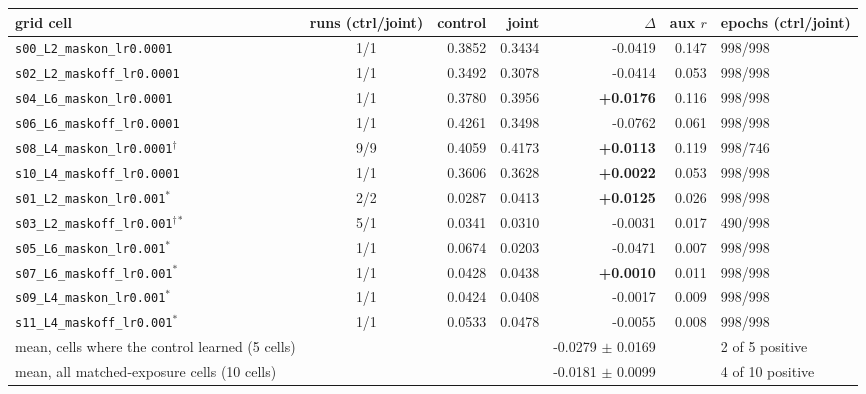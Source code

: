 \begin{table}[htbp]
\centering\small
\footnotesize
\begin{tabular}{lcrrrrl}
\toprule
grid cell & runs (ctrl/joint) & control & joint & $\Delta$ & aux $r$ & epochs (ctrl/joint) \\
\midrule
\texttt{s00\_L2\_maskon\_lr0.0001} & 1/1 & 0.3852 & 0.3434 & -0.0419 & 0.147 & 998/998 \\
\texttt{s02\_L2\_maskoff\_lr0.0001} & 1/1 & 0.3492 & 0.3078 & -0.0414 & 0.053 & 998/998 \\
\texttt{s04\_L6\_maskon\_lr0.0001} & 1/1 & 0.3780 & 0.3956 & \textbf{+0.0176} & 0.116 & 998/998 \\
\texttt{s06\_L6\_maskoff\_lr0.0001} & 1/1 & 0.4261 & 0.3498 & -0.0762 & 0.061 & 998/998 \\
\texttt{s08\_L4\_maskon\_lr0.0001}$^{\dagger}$ & 9/9 & 0.4059 & 0.4173 & \textbf{+0.0113} & 0.119 & 998/746 \\
\texttt{s10\_L4\_maskoff\_lr0.0001} & 1/1 & 0.3606 & 0.3628 & \textbf{+0.0022} & 0.053 & 998/998 \\
\texttt{s01\_L2\_maskon\_lr0.001}$^{\ast}$ & 2/2 & 0.0287 & 0.0413 & \textbf{+0.0125} & 0.026 & 998/998 \\
\texttt{s03\_L2\_maskoff\_lr0.001}$^{\dagger}$$^{\ast}$ & 5/1 & 0.0341 & 0.0310 & -0.0031 & 0.017 & 490/998 \\
\texttt{s05\_L6\_maskon\_lr0.001}$^{\ast}$ & 1/1 & 0.0674 & 0.0203 & -0.0471 & 0.007 & 998/998 \\
\texttt{s07\_L6\_maskoff\_lr0.001}$^{\ast}$ & 1/1 & 0.0428 & 0.0438 & \textbf{+0.0010} & 0.011 & 998/998 \\
\texttt{s09\_L4\_maskon\_lr0.001}$^{\ast}$ & 1/1 & 0.0424 & 0.0408 & -0.0017 & 0.009 & 998/998 \\
\texttt{s11\_L4\_maskoff\_lr0.001}$^{\ast}$ & 1/1 & 0.0533 & 0.0478 & -0.0055 & 0.008 & 998/998 \\
\midrule
mean, cells where the control learned (5 cells) & & & & -0.0279 $\pm$ 0.0169 & & 2 of 5 positive \\
mean, all matched-exposure cells (10 cells) & & & & -0.0181 $\pm$ 0.0099 & & 4 of 10 positive \\
\bottomrule
\end{tabular}

\end{table}
